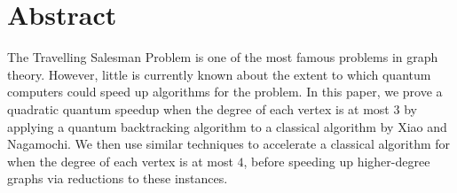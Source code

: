 \chapter*{Abstract}

The Travelling Salesman Problem is one of the most famous problems in graph theory. However, little is currently known about the extent to which quantum computers could speed up algorithms for the problem. In this paper, we prove a quadratic quantum speedup when the degree of each vertex is at most $3$ by applying a quantum backtracking algorithm to a classical algorithm by Xiao and Nagamochi. We then use similar techniques to accelerate a classical algorithm for when the degree of each vertex is at most $4$, before speeding up higher-degree graphs via reductions to these instances.